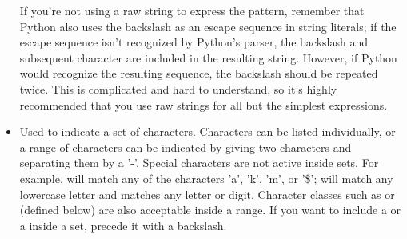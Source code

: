 \begin{itemize}
If you're not using a raw string to
express the pattern, remember that Python also uses the
backslash as an escape sequence in string literals; if the escape
sequence isn't recognized by Python's parser, the backslash and
subsequent character are included in the resulting string.  However,
if Python would recognize the resulting sequence, the backslash should
be repeated twice.  This is complicated and hard to understand, so
it's highly recommended that you use raw strings for all but the
simplest expressions.
%
\item[\code{[]}] Used to indicate a set of characters.  Characters can
be listed individually, or a range of characters can be indicated by
giving two characters and separating them by a '-'.  Special
characters are not active inside sets.  For example, \code{[akm\$]}
will match any of the characters 'a', 'k', 'm', or '\$'; \code{[a-z]}
will match any lowercase letter and \code{[a-zA-Z0-9]} matches any
letter or digit.  Character classes such as  or  (defined below) are also acceptable inside a range.  If you want to
include a \code{]} or a \code{-} inside a set, precede it with a
backslash.


\end{itemize}
